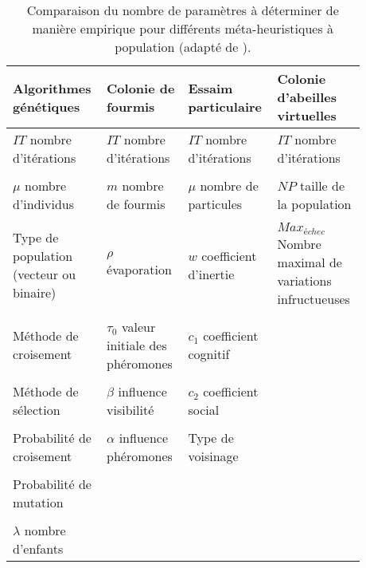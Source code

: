 \begin{table}
\centering
\caption{Comparaison du nombre de paramètres à déterminer de manière empirique pour différents
         méta-heuristiques à population (adapté de \cite{Armand-Decker2015}).}
\label{tab:meta_compare}
\small
\begin{tabular}{L{0.22\linewidth} L{0.22\linewidth} L{0.22\linewidth} L{0.22\linewidth}}
    \toprule
    \textbf{Algorithmes génétiques}          & \textbf{Colonie de fourmis}                &  \textbf{Essaim particulaire}   & \textbf{Colonie d’abeilles virtuelles}                  \\
    \midrule
    $IT$ nombre d’itérations                & $IT$ nombre d’itérations                    & $IT$ nombre d’itérations        & $IT$ nombre d’itérations                          \\
    \\
    $\mu$ nombre d’individus                 & $m$ nombre de fourmis                      & $\mu$ nombre de particules       & $NP$ taille de la population                            \\
    \\
    Type de population (vecteur ou binaire)  & $\rho$ évaporation                         & $w$ coefficient d’inertie       & $Max_{échec}$ Nombre maximal de variations infructueuses  \\
    \\
    Méthode de croisement                    & $\tau_{0}$ valeur initiale des phéromones  & $c_{1}$ coefficient cognitif    &                                                         \\
    \\
    Méthode de sélection                     & $\beta$ influence visibilité               & $c_{2}$ coefficient social      &                                                         \\
    \\
    Probabilité de croisement                & $\alpha$ influence phéromones              & Type de voisinage               &                                                         \\
    \\
    Probabilité de mutation                  &                                            &                                 &                                                         \\
    \\
    $\lambda$ nombre d’enfants               &                                            &                                 &                                                         \\
    \bottomrule
\end{tabular}
\end{table}

